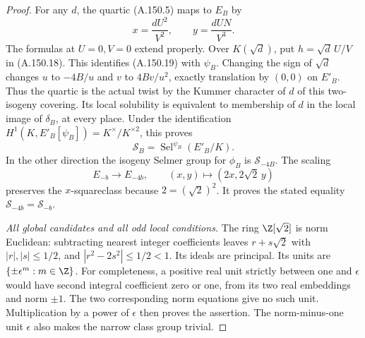 \begin{proof}
For any \(d\), the quartic (A.150.5) maps to \(E_B\) by
\[
           x=\frac{dU^2}{V^2},\qquad
           y=\frac{dUN}{V^3}.
\tag{A.150.19}
\]
The formulas at \(U=0,V=0\) extend properly.
Over \(K(\sqrt d)\), put \(h=\sqrt d\,U/V\) in
(A.150.18).  This identifies (A.150.19) with \(\psi_B\).
Changing the sign of \(\sqrt d\) changes \(u\) to
\(-4B/u\) and \(v\) to \(4Bv/u^2\), exactly translation
by \((0,0)\) on \(E'_B\).
Thus the quartic is the actual twist by the Kummer
character of \(d\) of this two-isogeny covering.
Its local solubility is equivalent to membership of
\(d\) in the local image of \(\delta_B\), at every place.
Under the identification
\(H^1(K,E'_B[\psi_B])=K^\times/K^{\times2}\), this proves
\[
                   \mathcal S_B
                     =\operatorname{Sel}^{\psi_B}(E'_B/K).
\tag{A.150.20}
\]
In the other direction the isogeny Selmer group for
\(\phi_B\) is \(\mathcal S_{-4B}\).
The scaling
\[
 E_{-b}\longrightarrow E_{-4b},\qquad
                (x,y)\longmapsto(2x,2\sqrt2\,y)
\tag{A.150.21}
\]
preserves the \(x\)-squareclass because \(2=(\sqrt2)^2\).
It proves the stated equality \(\mathcal S_{-4b}=\mathcal S_{-b}\).

\emph{All global candidates and all odd local conditions.}
The ring \(\Z[\sqrt2]\) is norm Euclidean: subtracting
nearest integer coefficients leaves \(r+s\sqrt2\) with
\(|r|,|s|\le1/2\), and
\(|r^2-2s^2|\le1/2<1\).
Its ideals are principal.
Its units are \(\{\pm\epsilon^m:m\in\Z\}\).
For completeness, a positive real unit strictly between
one and \(\epsilon\) would have second integral coefficient
zero or one, from its two real embeddings and norm
\(\pm1\).  The two corresponding norm equations give
no such unit.  Multiplication by a power of \(\epsilon\)
then proves the assertion.
The norm-minus-one unit \(\epsilon\) also makes the
narrow class group trivial.


\end{proof}
